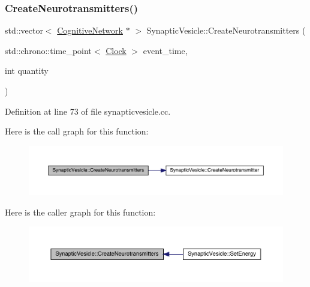 \subsubsection{\texorpdfstring{Create\+Neurotransmitters()}{CreateNeurotransmitters()}}
{\footnotesize\ttfamily std\+::vector$<$ \hyperlink{class_cognitive_network}{Cognitive\+Network} $\ast$ $>$ Synaptic\+Vesicle\+::\+Create\+Neurotransmitters (\begin{DoxyParamCaption}\item[{std\+::chrono\+::time\+\_\+point$<$ \hyperlink{universe_8h_a0ef8d951d1ca5ab3cfaf7ab4c7a6fd80}{Clock} $>$}]{event\+\_\+time,  }\item[{int}]{quantity }\end{DoxyParamCaption})}



Definition at line 73 of file synapticvesicle.\+cc.

Here is the call graph for this function\+:\nopagebreak
\begin{figure}[H]
\begin{center}
\leavevmode
\includegraphics[width=350pt]{class_synaptic_vesicle_a052b85a42c2d55ca146665c40cbabffd_cgraph}
\end{center}
\end{figure}
Here is the caller graph for this function\+:\nopagebreak
\begin{figure}[H]
\begin{center}
\leavevmode
\includegraphics[width=350pt]{class_synaptic_vesicle_a052b85a42c2d55ca146665c40cbabffd_icgraph}
\end{center}
\end{figure}
\mbox{\label{class_synaptic_vesicle_a5ab4ecfb4a880bc729078f5529c547bc}} 
